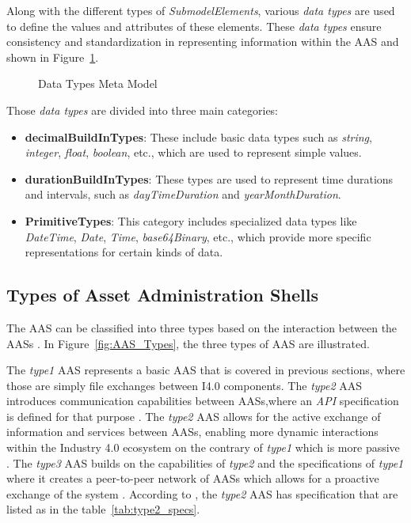\begin{longtable}{>{\raggedright\bfseries}p{4.5cm} >{\raggedright}p{4.5cm} >{\raggedright\arraybackslash}p{4.5cm}}
\end{longtable}
Along with the different types of \textit{SubmodelElements}, various \textit{data types} are used to define the values and attributes of these elements.
These \textit{data types} ensure consistency and standardization in representing information within the \ac{AAS} and shown in Figure~\ref{fig:data_types}.


\begin{figure}[p]
    \centering
    
    \caption{Data Types Meta Model \cite{plattformi40_aas_part1_v3}}
    \label{fig:data_types}
\end{figure}
Those \textit{data types} are divided into three main categories:
\begin{itemize}
    \item \textbf{decimalBuildInTypes}: These include basic data types such as \textit{string}, \textit{integer}, \textit{float}, \textit{boolean}, etc., which are used to represent simple values.
    \item \textbf{durationBuildInTypes}: These types are used to represent time durations and intervals, such as \textit{dayTimeDuration} and \textit{yearMonthDuration}.
    \item \textbf{PrimitiveTypes}: This category includes specialized data types like \textit{DateTime}, \textit{Date}, \textit{Time}, \textit{base64Binary}, etc., which provide more specific representations for certain kinds of data.
\end{itemize}

\subsection{Types of Asset Administration Shells}
The \ac{AAS} can be classified into three types based on the interaction between the \ac{AAS}s \cite{plattformI40_aas_part2}.
In Figure~\ref{fig:AAS_Types}, the three types of \ac{AAS} are illustrated.

The \textit{type1} \ac{AAS} represents a basic \ac{AAS} that is covered in previous sections, where those are simply 
file exchanges between \ac{I4.0} components.
The \textit{type2} \ac{AAS} introduces communication capabilities between \ac{AAS}s,where an \textit{\ac{API}} specification
is defined for that purpose \cite{plattformI40_aas_part2}.
The \textit{type2} \ac{AAS} allows for the active exchange of information and services between \ac{AAS}s,
enabling more dynamic interactions within the Industry 4.0 ecosystem on the contrary of 
\textit{type1} which is more passive \cite{plattformI40_aas_part2}.
The \textit{type3} \ac{AAS} builds on the capabilities of \textit{type2} and the 
specifications of \textit{type1} where it creates a peer-to-peer network of \ac{AAS}s 
which allows for a proactive exchange of the system \cite{plattformI40_aas_part2}.
According to \cite{plattformI40_aas_part2}, the \textit{type2} \ac{AAS}
has specification that are listed as in the table~\ref{tab:type2_specs}.


